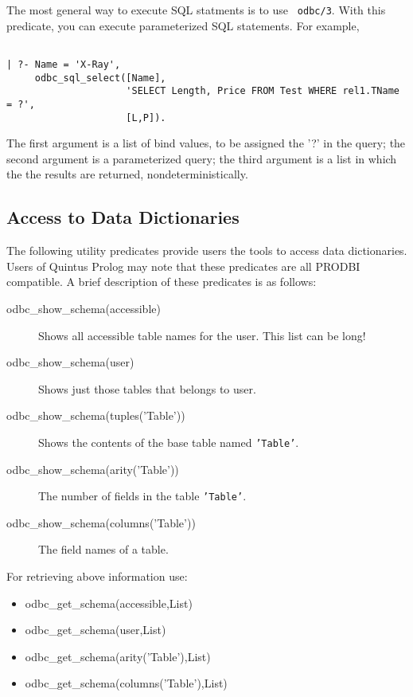 The most general way to execute SQL statments is to use {\tt
odbc\sql/3}.  With this predicate, you can execute parameterized SQL
statements.  For example,

\begin{verbatim}

| ?- Name = 'X-Ray',
     odbc_sql_select([Name],
                     'SELECT Length, Price FROM Test WHERE rel1.TName = ?',
                     [L,P]).
\end{verbatim}

The first argument is a list of bind values, to be assigned the '?' in
the query; the second argument is a parameterized query; the third
argument is a list in which the the results are returned,
nondeterministically.

\subsection{Access to Data Dictionaries}

The following utility predicates provide users the tools to access data 
dictionaries.  Users of Quintus Prolog may note that these predicates are all 
PRODBI compatible.  A brief description of these predicates is as follows:
\begin{description}

\item[odbc\_show\_schema(accessible)]
         Shows all accessible table names for the user.  This list can be long!

\item[odbc\_show\_schema(user)]
        Shows just those tables that belongs to user.

\item[odbc\_show\_schema(tuples('Table'))]
        Shows the contents of the base table named {\tt 'Table'}.

\item[odbc\_show\_schema(arity('Table'))]
        The number of fields in the table {\tt 'Table'}.

\item[odbc\_show\_schema(columns('Table'))]
        The field names of a table.
\end{description}

For retrieving above information use:
\begin{itemize}

\item odbc\_get\_schema(accessible,List)
\item odbc\_get\_schema(user,List)
\item odbc\_get\_schema(arity('Table'),List)
\item odbc\_get\_schema(columns('Table'),List)
\end{itemize}

